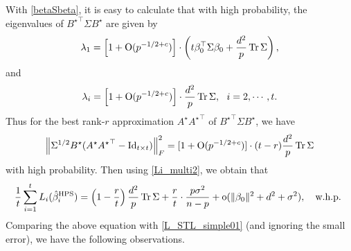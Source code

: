 {\begin{example}
With \eqref{betaSbeta}, it is easy to calculate that with high probability, the eigenvalues of ${B^{\star}}^{\top} \Sigma B^{\star}$ are given by
$$\lambda_1=\left[1+\operatorname{O}(p^{-1/2+c})\right]\cdot\left(t \beta_0^\top \Sigma \beta_0  + \frac{d^2}{ p}\operatorname{Tr} \Sigma\right) ,$$
and
$$ \lambda_i=\left[1+\operatorname{O}(p^{-1/2+c})\right]\cdot \frac{d^2}{ p}\operatorname{Tr} \Sigma , \ \ i=2,\cdots, t.$$ %
Thus for the best rank-$r$ approximation $A^\star {A^\star}^\top$  of ${B^{\star}}^{\top}\Sigma  B^{\star}$, we have
$$\left\| \Sigma^{1/2} B^{\star} (A^\star {A^\star}^{\top} - \operatorname{Id}_{t\times t}) \right\|_F^2= [1+\operatorname{O}(p^{-1/2+c})]\cdot(t-r)\frac{d^2}{ p}\operatorname{Tr} \Sigma $$
with high probability.
Then using \eqref{Li_multi2}, we obtain that
\[ \frac{1}{t}\sum_{i=1}^t L_i(\hat{\beta}_i^{\textup{HPS}}) = \left({1 - \frac{r}{t}}\right) \frac{d^2}{p}\operatorname{Tr} \Sigma + \frac{r}{t} \cdot \frac{p\sigma^2 }{n - p} +\operatorname{o}(\|\beta_0\|^2+d^2 + \sigma^2) ,\quad \text{w.h.p. }\]
Comparing the above equation with \eqref{L_STL_simple01} (and ignoring the small error), we have the following observations.

\end{example}}
